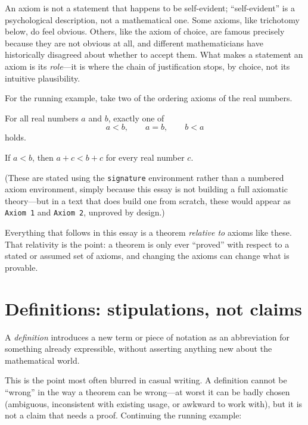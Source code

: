 \documentclass{essay}
\begin{document}
An axiom is not a statement that happens to be self-evident; ``self-evident'' is a psychological description, not a mathematical one. Some axioms, like trichotomy below, do feel obvious. Others, like the axiom of choice, are famous precisely because they are not obvious at all, and different mathematicians have historically disagreed about whether to accept them. What makes a statement an axiom is its \emph{role}---it is where the chain of justification stops, by choice, not its intuitive plausibility.

For the running example, take two of the ordering axioms of the real numbers.

\begin{signature}[Trichotomy]
For all real numbers \(a\) and \(b\), exactly one of
\[
a<b,\qquad a=b,\qquad b<a
\]
holds.
\end{signature}

\begin{signature}
If \(a<b\), then \(a+c<b+c\) for every real number \(c\).
\end{signature}

(These are stated using the \texttt{signature} environment rather than a numbered axiom environment, simply because this essay is not building a full axiomatic theory---but in a text that does build one from scratch, these would appear as \texttt{Axiom 1} and \texttt{Axiom 2}, unproved by design.)

Everything that follows in this essay is a theorem \emph{relative to} axioms like these. That relativity is the point: a theorem is only ever ``proved'' with respect to a stated or assumed set of axioms, and changing the axioms can change what is provable.

\section{Definitions: stipulations, not claims}

\begin{definition}
A \emph{definition} introduces a new term or piece of notation as an abbreviation for something already expressible, without asserting anything new about the mathematical world.
\end{definition}

This is the point most often blurred in casual writing. A definition cannot be ``wrong'' in the way a theorem can be wrong---at worst it can be badly chosen (ambiguous, inconsistent with existing usage, or awkward to work with), but it is not a claim that needs a proof. Continuing the running example:
\end{document}
